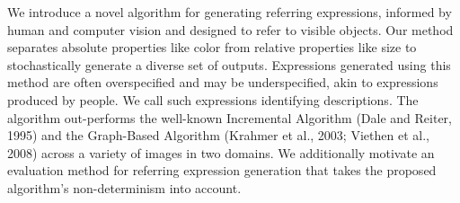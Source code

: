 We introduce a novel algorithm for generating referring expressions, informed by human and computer vision and designed to refer to visible objects. Our
 method separates absolute properties like color from relative properties like
 size to stochastically generate a diverse set of outputs. Expressions generated
 using this method are often overspecified and may be underspecified, akin to
 expressions produced by people. We call such expressions identifying
 descriptions. The algorithm out-performs the well-known Incremental Algorithm
 (Dale and Reiter, 1995) and the Graph-Based Algorithm (Krahmer et al., 2003;
 Viethen et al., 2008) across a variety of images in two domains. We
 additionally motivate an evaluation method for referring expression generation
 that takes the proposed algorithm's non-determinism into account.

